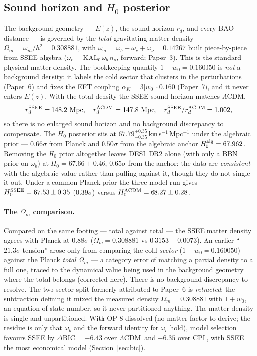 \documentclass[12pt,a4paper]{article}
\newcommand{\SSEE}{\ifmmode\mathrm{SSEE}\else\textsc{ssee}\fi}
\newcommand{\LCDM}{\ifmmode\Lambda\mathrm{CDM}\else$\Lambda$CDM\fi}
\newcommand{\HZeroPosterior}{67.79^{+0.35}_{-0.35}}
\begin{document}
\subsection{Sound horizon and $H_0$ posterior}

The background geometry --- $E(z)$, the sound horizon $r_d$, and every BAO
distance --- is governed by the \emph{total} gravitating matter density
$\Omega_m = \omega_m/h^2 = 0.308881$, with
$\omega_m=\omega_b+\omega_c+\omega_\nu=0.14267$ built piece-by-piece from SSEE
algebra ($\omega_c=\mathrm{KAL_0}\,\omega_b\,n_s$, forward; Paper~3). This is
the standard physical matter density. The bookkeeping quantity $1+w_0=0.160050$ is
\emph{not} a background density: it labels the cold sector that clusters in the
perturbations (Paper~6) and fixes the EFT coupling
$\alpha_K = 3|w_0|\cdot 0.160$ (Paper~7), and it never enters $E(z)$.
With the total density the SSEE sound horizon matches \LCDM,
\begin{equation}
  r_d^{\SSEE}=148.2\ \text{Mpc},\quad
  r_d^{\LCDM}=147.8\ \text{Mpc},\quad
  r_d^{\SSEE}/r_d^{\LCDM}=1.002,
  \label{eq:rd_ratio}
\end{equation}
so there is no enlarged sound horizon and no background discrepancy to
compensate. The $H_0$ posterior sits at $\HZeroPosterior$\,km\,s$^{-1}$\,Mpc$^{-1}$
under the algebraic prior --- $0.66\sigma$ from Planck and $0.50\sigma$
from the algebraic anchor $H_0^{\rm alg}=67.962$. Removing the $H_0$ prior
altogether leaves DESI~DR2 alone (with only a BBN prior on $\omega_b$) at
$H_0=67.66\pm0.46$, $0.65\sigma$ from the anchor: the data are
\emph{consistent} with the algebraic value rather than pulling against it,
though they do not single it out. Under a common
Planck prior the three-model run gives $H_0^{\SSEE}=67.53\pm0.35$
($0.39\sigma$) versus $H_0^{\LCDM}=68.27\pm0.28$.

\paragraph{The $\Omega_m$ comparison.}
Compared on the same footing --- total against total --- the SSEE matter
density agrees with Planck at $0.88\sigma$
($\Omega_m=0.308881$ vs $0.3153\pm0.0073$). An earlier ``$21.3\sigma$ tension''
arose only from comparing the cold \emph{sector} ($1+w_0=0.160050$) against the
Planck \emph{total} $\Omega_m$ --- a category error of matching a partial
density to a full one, traced to the dynamical value being used in the
background geometry where the total belongs (corrected here). There is no
background discrepancy to resolve. The two-sector split formerly attributed to
Paper~6 is \emph{retracted}: the subtraction defining it mixed the measured
density $\Omega_m=0.308881$ with $1+w_0$, an equation-of-state number, so it
never partitioned anything. The matter density is single and unpartitioned.
With OP-8 dissolved (no matter factor to derive; the residue is only that
$\omega_b$ and the forward identity for $\omega_c$ hold), model selection
favours SSEE by $\Delta\mathrm{BIC}=-6.43$ over \LCDM\ and $-6.35$ over CPL, with
SSEE the most economical model (Section~\ref{sec:bic}).
\end{document}
